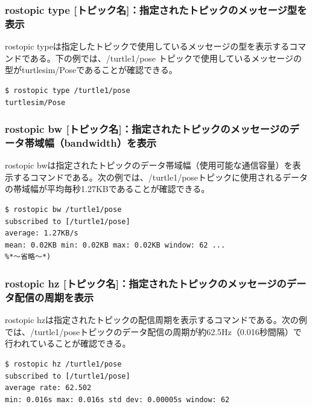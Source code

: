 \subsubsection{rostopic type [トピック名]：指定されたトピックのメッセージ型を表示}

rostopic typeは指定したトピックで使用しているメッセージの型を表示するコマンドである。下の例では、/turtle1/pose トピックで使用しているメッセージの型がturtlesim/Poseであることが確認できる。

\begin{lstlisting}[language=ROS]
$ rostopic type /turtle1/pose
turtlesim/Pose
\end{lstlisting}

\subsubsection{rostopic bw [トピック名]：指定されたトピックのメッセージのデータ帯域幅（bandwidth）を表示}

rostopic bwは指定されたトピックのデータ帯域幅（使用可能な通信容量）を表示するコマンドである。次の例では、/turtle1/poseトピックに使用されるデータの帯域幅が平均毎秒1.27KBであることが確認できる。

\begin{lstlisting}[language=ROS]
$ rostopic bw /turtle1/pose
subscribed to [/turtle1/pose]
average: 1.27KB/s
mean: 0.02KB min: 0.02KB max: 0.02KB window: 62 ...
%*〜省略〜*)
\end{lstlisting}

\subsubsection{rostopic hz [トピック名]：指定されたトピックのメッセージのデータ配信の周期を表示}

rostopic hzは指定されたトピックの配信周期を表示するコマンドである。次の例では、/turtle1/poseトピックのデータ配信の周期が約62.5Hz（0.016秒間隔）で行われていることが確認できる。

\begin{lstlisting}[language=ROS]
$ rostopic hz /turtle1/pose
subscribed to [/turtle1/pose]
average rate: 62.502
min: 0.016s max: 0.016s std dev: 0.00005s window: 62
\end{lstlisting}

